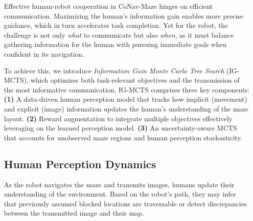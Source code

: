Effective human-robot cooperation in CoNav-Maze hinges on efficient communication. Maximizing the human’s information gain enables more precise guidance, which in turn accelerates task completion. Yet for the robot, the challenge is not only \emph{what} to communicate but also \emph{when}, as it must balance gathering information for the human with pursuing immediate goals when confident in its navigation.

To achieve this, we introduce \emph{Information Gain Monte Carlo Tree Search} (IG-MCTS), which optimizes both task-relevant objectives and the transmission of the most informative communication. IG-MCTS comprises three key components:
\textbf{(1)} A data-driven human perception model that tracks how implicit (movement) and explicit (image) information updates the human’s understanding of the maze layout.
\textbf{(2)} Reward augmentation to integrate multiple objectives effectively leveraging on the learned perception model.
\textbf{(3)} An uncertainty-aware MCTS that accounts for unobserved maze regions and human perception stochasticity.

\subsection{Human Perception Dynamics}

\label{sec:perception_mdp}
As the robot navigates the maze and transmits images, humans update their understanding of the environment. Based on the robot's path, they may infer that previously assumed blocked locations are traversable or detect discrepancies between the transmitted image and their map.  


